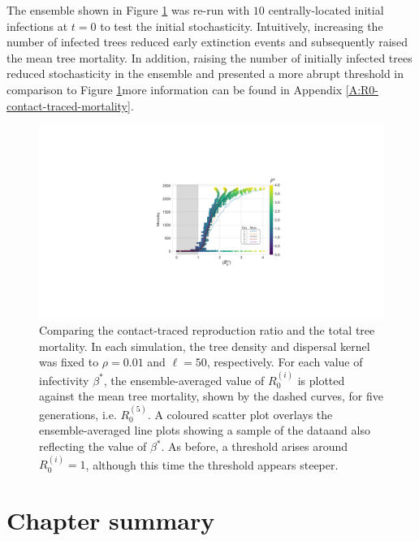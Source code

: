 The ensemble shown in Figure \ref{fig:contact-trace-vs-mortality} was re-run with $10$ centrally-located initial infections at $t=0$ to test the initial stochasticity.
Intuitively, increasing the number of infected trees reduced early extinction events and subsequently raised the mean tree mortality.
In addition, raising the number of initially infected trees reduced stochasticity in the ensemble and presented a more abrupt threshold in comparison to Figure \ref{fig:contact-trace-vs-mortality}\textemdash more information can be found in Appendix \ref{A:R0-contact-traced-mortality}.

\begin{figure}
    \centering
    \includegraphics[scale=0.6]{chapter5/figures/fig6-R0-contact-vs-mortality.pdf}
    \caption{Comparing the contact-traced reproduction ratio and the total tree mortality. 
    In each simulation, the tree density and dispersal kernel was fixed to $\rho=0.01$ and $\ell=50$, respectively. 
    For each value of infectivity $\beta^*$, the ensemble-averaged value of $R_0^{(i)}$ is plotted against the mean tree mortality, shown by the dashed curves, for five generations, i.e. $R_{0}^{(5)}$.
    A coloured scatter plot overlays the ensemble-averaged line plots showing a sample of the data\textemdash and also reflecting the value of $\beta^*$.
    As before, a threshold arises around $R_0^{(i)} = 1$, although this time the threshold appears steeper.}
    \label{fig:contact-trace-vs-mortality}
\end{figure}

\newpage
\section{Chapter summary}

